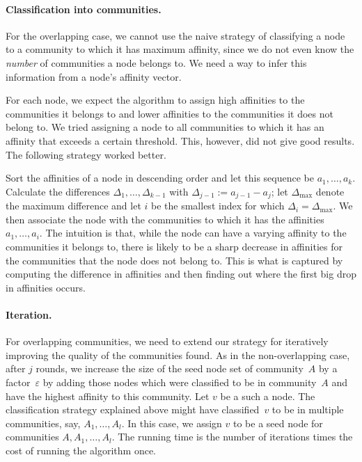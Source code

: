 \paragraph{Classification into communities.} For the overlapping case, we cannot
use the naive strategy of classifying a node to a community to which it has 
maximum affinity, since we do not even know the \emph{number} of communities a node belongs to. 
We need a way to infer this information from a node's affinity vector.

For each node, we expect the algorithm to assign high affinities to the communities 
it belongs to and lower affinities to the communities it does not belong to. 
We tried assigning a node to all communities to which it has an affinity that 
exceeds a certain threshold. This, however, did not give good results.
The following strategy worked better. 

Sort the affinities of a node in descending order and let this 
sequence be $a_1, \ldots, a_k$. Calculate the differences 
$\Delta_{1}, \ldots, \Delta_{k-1}$ with $\Delta_{j-1} := a_{j - 1} - a_j$;
let $\Delta_{\mathrm{max}}$ denote the maximum difference 
and let $i$ be the smallest index for which $\Delta_i = \Delta_{\mathrm{max}}$. We then associate 
the node with the communities to which it has the affinities $a_1, \ldots, a_i$. 
The intuition is that, while the node can have a varying affinity to the communities it belongs to, 
there is likely to be a sharp decrease in affinities for the communities that the node does 
not belong to. This is what is captured by computing the difference in affinities and then finding 
out where the first big drop in affinities occurs.

\paragraph{Iteration.}
For overlapping communities, we need to extend our strategy for iteratively improving the quality 
of the communities found. As in the non-overlapping case, after $j$ rounds, we increase the 
size of the seed node set of community~$A$ by a factor~$\varepsilon$ by adding those nodes 
which were classified to be in community~$A$ and have the highest affinity to this community. 
Let $v$ be a such a node. The classification strategy explained above might have classified~$v$ 
to be in multiple communities, say, $A_1, \dots, A_l$. In this case, we assign $v$ 
to be a seed node for communities $A, A_1, \ldots, A_l$. The running time is the number of 
iterations times the cost of running the algorithm once.


